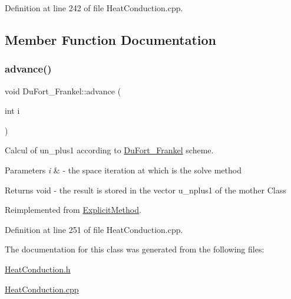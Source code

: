 Definition at line 242 of file Heat\+Conduction.\+cpp.



\subsection{Member Function Documentation}
\mbox{\label{class_du_fort___frankel_ae8a6c6c56b2a4ce3bf7f80075a2cf680}} 
\subsubsection{\texorpdfstring{advance()}{advance()}}
{\footnotesize\ttfamily void Du\+Fort\+\_\+\+Frankel\+::advance (\begin{DoxyParamCaption}\item[{int}]{i }\end{DoxyParamCaption})\hspace{0.3cm}{\ttfamily [virtual]}}



Calcul of un\+\_\+plus1 according to \hyperlink{class_du_fort___frankel}{Du\+Fort\+\_\+\+Frankel} scheme. 


\begin{DoxyParams}{Parameters}
{\em i} & -\/ the space iteration at which is the solve method \\
\hline
\end{DoxyParams}
\begin{DoxyReturn}{Returns}
void -\/ the result is stored in the vector u\+\_\+nplus1 of the mother Class 
\end{DoxyReturn}


Reimplemented from \hyperlink{class_explicit_method_afdff9dbaacf767cdfe295103f3de41ef}{Explicit\+Method}.



Definition at line 251 of file Heat\+Conduction.\+cpp.



The documentation for this class was generated from the following files\+:\begin{DoxyCompactItemize}
\item 
\hyperlink{_heat_conduction_8h}{Heat\+Conduction.\+h}\item 
\hyperlink{_heat_conduction_8cpp}{Heat\+Conduction.\+cpp}\end{DoxyCompactItemize}
